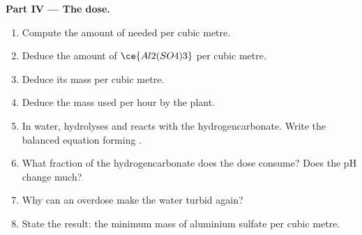\begin{problem}
\medskip\noindent\textbf{Part IV --- The dose.}
\begin{enumerate}[resume]
  \item Compute the amount of  needed per cubic metre.
  \item Deduce the amount of $\ce{Al2(SO4)3}$ per cubic metre.
  \item Deduce its mass per cubic metre.
  \item Deduce the mass used per hour by the plant.
  \item In water,  hydrolyses and reacts with the hydrogencarbonate. Write the
        balanced equation forming .
  \item What fraction of the hydrogencarbonate does the dose consume? Does the
        pH change much?
  \item Why can an overdose make the water turbid again?
  \item State the result: the minimum mass of aluminium sulfate per cubic metre.
\end{enumerate}
\end{problem}
